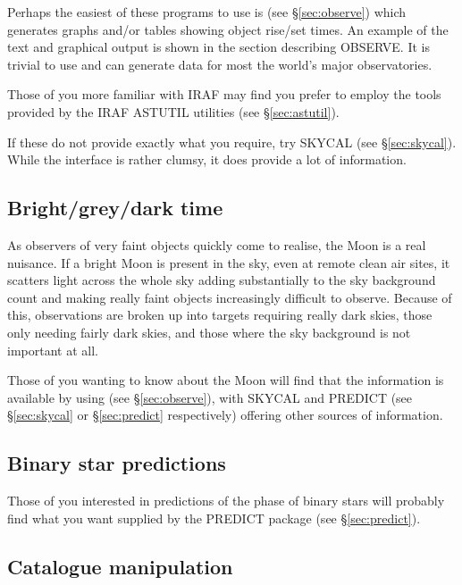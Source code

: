 Perhaps the easiest of these programs to use is {\OBSERVEref} 
(see \S{\ref{sec:observe}}) which generates graphs and/or tables showing object
rise/set times. An example of the text and graphical output is shown in 
the section describing OBSERVE. It is trivial to use and 
can generate data for most the world's major observatories.

Those of you more familiar with IRAF may find you prefer to employ the 
tools provided by the IRAF ASTUTIL utilities (see \S{\ref{sec:astutil}}).

If these do not provide exactly what you require, try SKYCAL (see \S{\ref{sec:skycal}}). While the
interface is rather clumsy, it does provide a lot of information.

\subsection{Bright/grey/dark time} 
\label{sec:bright}

As observers of very faint objects quickly come to realise, 
the Moon is a real nuisance. If a bright Moon is present in the sky,
even at remote clean air sites, it scatters light across the whole sky
adding substantially to the sky background count and making really
faint objects increasingly difficult to observe. Because of this,
observations are broken up into targets requiring really dark skies,
those only needing fairly dark skies, and those where the 
sky background is not important at all. 

Those of you wanting to know about the Moon will find that the information is 
available by using {\OBSERVEref} (see \S{\ref{sec:observe}}), with SKYCAL and 
PREDICT (see \S{\ref{sec:skycal}} or \S{\ref{sec:predict}} respectively) offering
other sources of information.

\subsection{Binary star predictions} 
\label{sec:binary}

Those of you interested in predictions of the phase of binary stars 
will probably find what you want supplied by  the PREDICT package (see \S{\ref{sec:predict}}).

\subsection{Catalogue manipulation} 
\label{sec:cataloguem}

